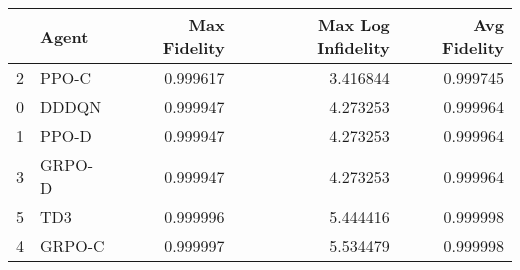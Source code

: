 \begin{tabular}{llrrr}
\toprule
 & Agent & Max Fidelity & Max Log Infidelity & Avg Fidelity \\
\midrule
2 & PPO-C & 0.999617 & 3.416844 & 0.999745 \\
0 & DDDQN & 0.999947 & 4.273253 & 0.999964 \\
1 & PPO-D & 0.999947 & 4.273253 & 0.999964 \\
3 & GRPO-D & 0.999947 & 4.273253 & 0.999964 \\
5 & TD3 & 0.999996 & 5.444416 & 0.999998 \\
4 & GRPO-C & 0.999997 & 5.534479 & 0.999998 \\
\bottomrule
\end{tabular}
